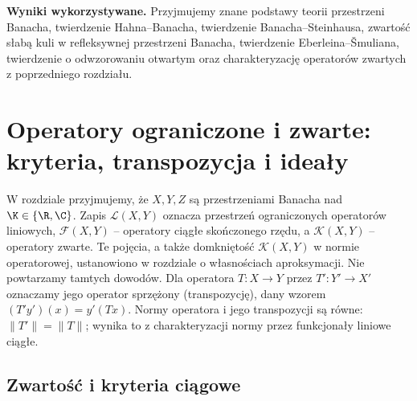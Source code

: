 \setcounter{section}{28}
\noindent\textbf{Wyniki wykorzystywane.} Przyjmujemy znane podstawy teorii przestrzeni Banacha, twierdzenie Hahna--Banacha, twierdzenie Banacha--Steinhausa, zwartość słabą kuli w refleksywnej przestrzeni Banacha, twierdzenie Eberleina--\v Smuliana, twierdzenie o odwzorowaniu otwartym oraz charakteryzację operatorów zwartych z poprzedniego rozdziału.
\par\medskip
\section{Operatory ograniczone i zwarte: kryteria, transpozycja i ideały}
\label{sec:operatory29}

W rozdziale przyjmujemy, że $X,Y,Z$ są przestrzeniami Banacha nad
$\K\in\{\R,\C\}$. Zapis $\mathcal L(X,Y)$ oznacza przestrzeń
ograniczonych operatorów liniowych, $\mathcal F(X,Y)$ -- operatory
ciągłe skończonego rzędu, a $\mathcal K(X,Y)$ -- operatory zwarte.
Te pojęcia, a także domkniętość $\mathcal K(X,Y)$ w normie operatorowej,
ustanowiono w rozdziale o własnościach aproksymacji. Nie powtarzamy
tamtych dowodów. Dla operatora $T:X\to Y$ przez $T':Y'\to X'$
oznaczamy jego operator sprzężony (transpozycję), dany wzorem
$(T'y')(x)=y'(Tx)$. Normy operatora i jego transpozycji są równe:
$\|T'\|=\|T\|$; wynika to z charakteryzacji normy przez
funkcjonały liniowe ciągłe.

\subsection{Zwartość i kryteria ciągowe}

